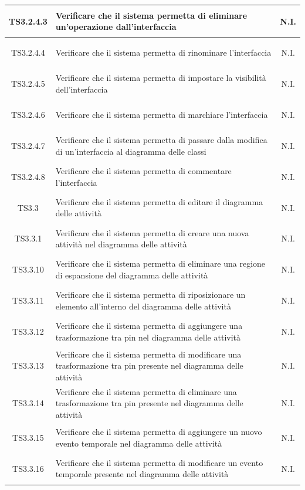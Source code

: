 \documentclass[../PianoDiQualifica.tex]{subfiles}
\begin{document}
\begin{longtable}{|c|>{\centering}p{10cm}|c|}
	\hline
	\hypertarget{TS3.2.4.3}{TS3.2.4.3} & Verificare che il sistema permetta di eliminare un'operazione dall'interfaccia & N.I. \\
	\hline
	\hypertarget{TS3.2.4.4}{TS3.2.4.4} & Verificare che il sistema permetta di rinominare l'interfaccia & N.I. \\
	\hline
	\hypertarget{TS3.2.4.5}{TS3.2.4.5} & Verificare che il sistema permetta di impostare la visibilità dell'interfaccia & N.I. \\
	\hline
	\hypertarget{TS3.2.4.6}{TS3.2.4.6} & Verificare che il sistema permetta di marchiare l'interfaccia & N.I. \\
	\hline
	\hypertarget{TS3.2.4.7}{TS3.2.4.7} & Verificare che il sistema permetta di passare dalla modifica di un'interfaccia al diagramma delle classi & N.I. \\
	\hline
	\hypertarget{TS3.2.4.8}{TS3.2.4.8} & Verificare che il sistema permetta di commentare l'interfaccia & N.I. \\
	\hline
	\hypertarget{TS3.3}{TS3.3} & Verificare che il sistema permetta di editare il diagramma delle attività & N.I. \\
	\hline
	\hypertarget{TS3.3.1}{TS3.3.1} & Verificare che il sistema permetta di creare una nuova attività nel diagramma delle attività & N.I. \\
	\hline
	\hypertarget{TS3.3.10}{TS3.3.10} & Verificare che il sistema permetta di eliminare una regione di espansione del diagramma delle attività & N.I. \\
	\hline
	\hypertarget{TS3.3.11}{TS3.3.11} & Verificare che il sistema permetta di riposizionare un elemento all'interno del diagramma delle attività & N.I. \\
	\hline
	\hypertarget{TS3.3.12}{TS3.3.12} & Verificare che il sistema permetta di aggiungere una trasformazione tra pin nel diagramma delle attività & N.I. \\
	\hline
	\hypertarget{TS3.3.13}{TS3.3.13} & Verificare che il sistema permetta di modificare una trasformazione tra pin presente nel diagramma delle attività & N.I. \\
	\hline
	\hypertarget{TS3.3.14}{TS3.3.14} & Verificare che il sistema permetta di eliminare una trasformazione tra pin presente nel diagramma delle attività & N.I. \\
	\hline
	\hypertarget{TS3.3.15}{TS3.3.15} & Verificare che il sistema permetta di aggiungere un nuovo evento temporale nel diagramma delle attività & N.I. \\
	\hline
	\hypertarget{TS3.3.16}{TS3.3.16} & Verificare che il sistema permetta di modificare un evento temporale presente nel diagramma delle attività & N.I. \\

\end{longtable}
\end{document}
